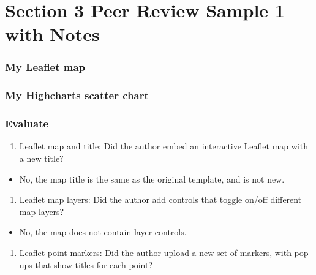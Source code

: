 \documentclass[
  english,
]{book}
\providecommand{\tightlist}{%
  \setlength{\itemsep}{0pt}\setlength{\parskip}{0pt}}
\begin{document}
\hypertarget{peer-3-sample-1-notes}{%
\section{Section 3 Peer Review Sample 1 with Notes}\label{peer-3-sample-1-notes}}

\hypertarget{my-leaflet-map-1}{%
\subsubsection{My Leaflet map}\label{my-leaflet-map-1}}

\hypertarget{my-highcharts-scatter-chart-1}{%
\subsubsection{My Highcharts scatter chart}\label{my-highcharts-scatter-chart-1}}

\hypertarget{evaluate-5}{%
\subsubsection{Evaluate}\label{evaluate-5}}

\begin{enumerate}
\def\labelenumi{\arabic{enumi}.}
\tightlist
\item
  Leaflet map and title: Did the author embed an interactive Leaflet map with a new title?
\end{enumerate}

\begin{itemize}
\tightlist
\item
  No, the map title is the same as the original template, and is not new.
\end{itemize}

\begin{enumerate}
\def\labelenumi{\arabic{enumi}.}
\setcounter{enumi}{1}
\tightlist
\item
  Leaflet map layers: Did the author add controls that toggle on/off different map layers?
\end{enumerate}

\begin{itemize}
\tightlist
\item
  No, the map does not contain layer controls.
\end{itemize}

\begin{enumerate}
\def\labelenumi{\arabic{enumi}.}
\setcounter{enumi}{2}
\tightlist
\item
  Leaflet point markers: Did the author upload a new set of markers, with pop-ups that show titles for each point?
\end{enumerate}
\end{document}
